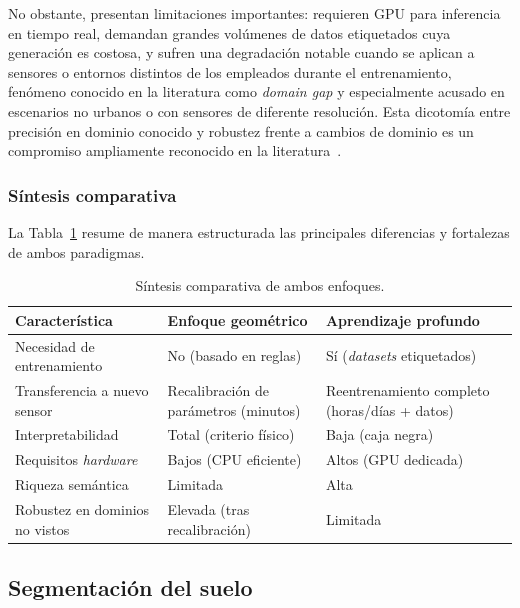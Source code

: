No obstante, presentan limitaciones importantes: requieren GPU para
inferencia en tiempo real, demandan grandes volúmenes de datos
etiquetados cuya generación es costosa, y sufren una degradación
notable cuando se aplican a sensores o entornos distintos de los
empleados durante el entrenamiento, fenómeno conocido en la literatura
como \textit{domain gap} y especialmente acusado en escenarios no
urbanos o con sensores de diferente resolución. Esta dicotomía entre
precisión en dominio conocido y robustez frente a cambios de dominio es
un compromiso ampliamente reconocido en la
literatura~\cite{gomes2023survey}.

\subsubsection{Síntesis comparativa}
\label{sec:sintesis}

La Tabla~\ref{tab:comparativa-paradigmas} resume de manera estructurada
las principales diferencias y fortalezas de ambos paradigmas.

\begin{table}[H]
    \centering
    \caption{Síntesis comparativa de ambos enfoques.}
    \label{tab:comparativa-paradigmas}
    \begin{tabularx}{\textwidth}{@{}lXX@{}}
        \toprule
        \textbf{Característica} & \textbf{Enfoque geométrico} & \textbf{Aprendizaje profundo} \\
        \midrule
        Necesidad de entrenamiento & No (basado en reglas) & Sí (\textit{datasets} etiquetados) \\
        Transferencia a nuevo sensor & Recalibración de parámetros (minutos) & Reentrenamiento completo (horas/días + datos) \\
        Interpretabilidad & Total (criterio físico) & Baja (caja negra) \\
        Requisitos \textit{hardware} & Bajos (CPU eficiente) & Altos (GPU dedicada) \\
        Riqueza semántica & Limitada & Alta \\
        Robustez en dominios no vistos & Elevada (tras recalibración) & Limitada \\
        \bottomrule
    \end{tabularx}
\end{table}

\subsection{Segmentación del suelo}
\label{sec:segmentacion-suelo}

